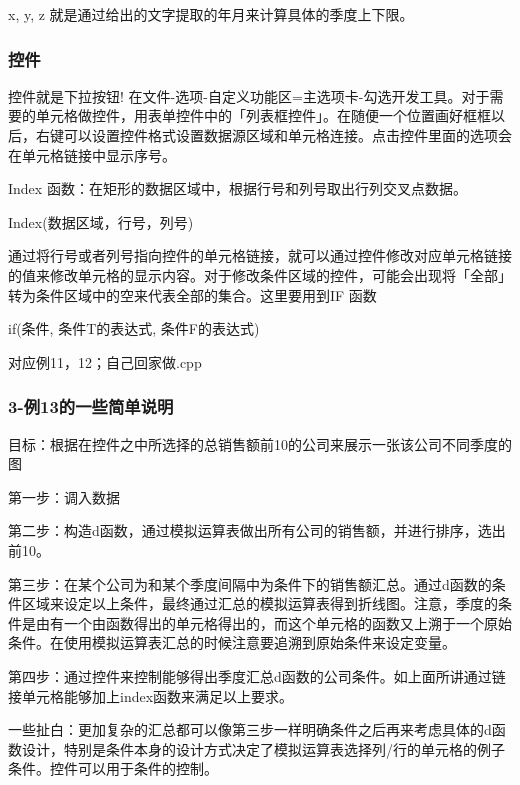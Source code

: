 \documentclass[10pt, a4paper]{article}
\begin{document}
                x, y, z 就是通过给出的文字提取的年月来计算具体的季度上下限。

            \subsubsection{控件}
            控件就是下拉按钮! 在文件-选项-自定义功能区=主选项卡-勾选开发工具。对于需要的单元格做控件，用表单控件中的「列表框控件」。在随便一个位置画好框框以后，右键可以设置控件格式设置数据源区域和单元格连接。点击控件里面的选项会在单元格链接中显示序号。 
                
            Index 函数：在矩形的数据区域中，根据行号和列号取出行列交叉点数据。
            \begin{center}
                Index(数据区域，行号，列号)
            \end{center}

            通过将行号或者列号指向控件的单元格链接，就可以通过控件修改对应单元格链接的值来修改单元格的显示内容。对于修改条件区域的控件，可能会出现将「全部」转为条件区域中的空来代表全部的集合。这里要用到IF 函数

            \begin{center}
                if(条件, 条件T的表达式, 条件F的表达式)
            \end{center}

            对应例11，12；自己回家做.cpp 

            \subsubsection{3-例13的一些简单说明}
                目标：根据在控件之中所选择的总销售额前10的公司来展示一张该公司不同季度的图

                第一步：调入数据
                
                第二步：构造d函数，通过模拟运算表做出所有公司的销售额，并进行排序，选出前10。
                
                第三步：在某个公司为和某个季度间隔中为条件下的销售额汇总。通过d函数的条件区域来设定以上条件，最终通过汇总的模拟运算表得到折线图。注意，季度的条件是由有一个由函数得出的单元格得出的，而这个单元格的函数又上溯于一个原始条件。在使用模拟运算表汇总的时候注意要追溯到原始条件来设定变量。
                
                第四步：通过控件来控制能够得出季度汇总d函数的公司条件。如上面所讲通过链接单元格能够加上index函数来满足以上要求。

                一些扯白：更加复杂的汇总都可以像第三步一样明确条件之后再来考虑具体的d函数设计，特别是条件本身的设计方式决定了模拟运算表选择列/行的单元格的例子条件。控件可以用于条件的控制。
\end{document}
